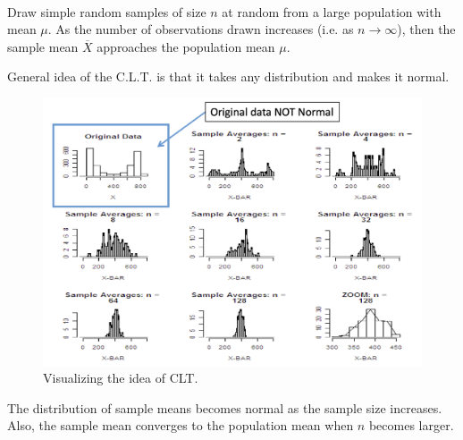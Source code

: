 \begin{theorem}
    \phantom{}\\
    Draw simple random samples of size $n$ at random from a large population with mean $\mu$. As the number of observations drawn increases (i.e. as $n \to \infty$), then the sample mean $\overline{X}$ approaches the population mean $\mu$.
\end{theorem}

General idea of the C.L.T. is that it takes any distribution and makes it normal.
\begin{figure}[htbp]
    \center
    \includegraphics[scale=0.4]{img/CLT-ex.png}
    \caption{Visualizing the idea of CLT.}
\end{figure}

\begin{note}
    The distribution of sample means becomes normal as the sample size increases. Also, the sample mean converges to the population mean when $n$ becomes larger.
\end{note}


\pagebreak


